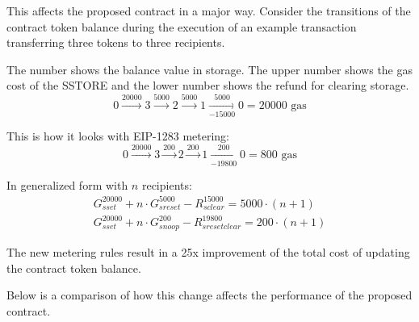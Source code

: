 \documentclass[12pt]{article}
\begin{document}
This affects the proposed contract in a major way.
Consider the transitions of the contract token balance during the execution of an example transaction transferring three tokens to three recipients.

The number shows the balance value in storage. The upper number shows the gas cost of the SSTORE and the lower number shows the refund for clearing storage.
\begin{equation}
0 \xrightarrow{20000} 3 \xrightarrow{5000} 2 \xrightarrow{5000} 1 \xrightarrow[-15000]{5000} 0 = 20000 \text{ gas}	
\end{equation}

This is how it looks with EIP-1283 metering:
\begin{equation}
0 \xrightarrow{20000} 3 \xrightarrow{200} 2 \xrightarrow{200} 1 \xrightarrow[-19800]{200} 0 = 800 \text{ gas}	
\end{equation}

In generalized form with $n$ recipients:
\begin{gather}
G_{sset}^{20000} + n \cdot G_{sreset}^{5000} - R_{sclear}^{15000} = 5000 \cdot (n + 1) \\
G_{sset}^{20000} + n \cdot G_{snoop}^{200} - R_{sresetclear}^{19800} = 200 \cdot (n + 1)
\end{gather}

The new metering rules result in a 25x improvement of the total cost of updating the contract token balance.

Below is a comparison of how this change affects the performance of the proposed contract.
\end{document}
